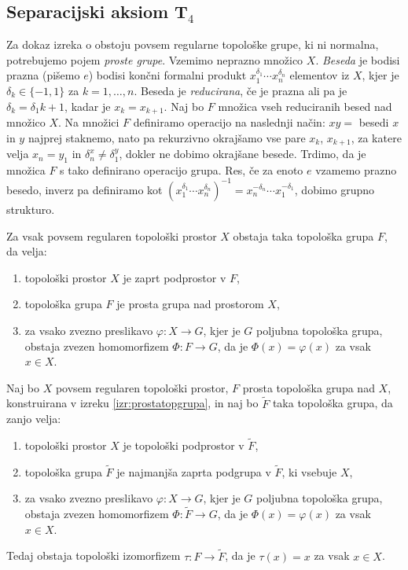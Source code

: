\documentclass[mat1]{fmfdelo}
\begin{document}
\subsection{Separacijski aksiom T$_4$}
Za dokaz izreka o obstoju povsem regularne topološke grupe, ki ni normalna, potrebujemo pojem \emph{proste grupe}. Vzemimo neprazno množico $X$. \emph{Beseda} je bodisi prazna (pišemo $e$) bodisi končni formalni produkt $x_1^{\delta_1}\cdots x_n^{\delta_n}$ elementov iz $X$, kjer je $\delta_k \in \lbrace -1, 1\rbrace$ za $k = 1,\dots,n$. Beseda je \emph{reducirana}, če je prazna ali pa je $\delta_k = \delta_1{k+1}$, kadar je $x_k = x_{k+1}$. Naj bo $F$ množica vseh reduciranih besed nad množico $X$. Na množici $F$ definiramo operacijo na naslednji način: $xy = $ besedi $x$ in $y$ najprej staknemo, nato pa rekurzivno okrajšamo vse pare $x_k$, $x_{k+1}$, za katere velja $x_n = y_1$ in $\delta_n^x \neq \delta_1^y$, dokler ne dobimo okrajšane besede. Trdimo, da je množica $F$ s tako definirano operacijo grupa. Res, če za enoto $e$ vzamemo prazno besedo, inverz pa definiramo kot $(x_1^{\delta_1}\cdots x_n^{\delta_n})^{-1} = x_n^{-\delta_n}\cdots x_1^{-\delta_1}$, dobimo grupno strukturo.

\begin{izrek}\label{izr:prostatopgrupa}
Za vsak povsem regularen topološki prostor $X$ obstaja taka topološka grupa $F$, da velja:
\begin{enumerate}
	\item topološki prostor $X$ je zaprt podprostor v $F$,
	\item topološka grupa $F$ je prosta grupa nad prostorom $X$,
	\item za vsako zvezno preslikavo $\varphi\colon X \to G$, kjer je $G$ poljubna topološka grupa, obstaja zvezen homomorfizem $\Phi\colon F \to G$, da je $\Phi(x) = \varphi(x)$ za vsak $x \in X$.
\end{enumerate}
\end{izrek}

\begin{izrek}\label{izr:prostaizo}
Naj bo $X$ povsem regularen topološki prostor, $F$ prosta topološka grupa nad $X$, konstruirana v izreku \ref{izr:prostatopgrupa}, in naj bo $\widetilde{F}$ taka topološka grupa, da zanjo velja:
\begin{enumerate}
	\item topološki prostor $X$ je topološki podprostor v $\widetilde{F}$,
	\item topološka grupa $\widetilde{F}$ je najmanjša zaprta podgrupa v $\widetilde{F}$, ki vsebuje $X$,
	\item za vsako zvezno preslikavo $\varphi\colon X \to G$, kjer je $G$ poljubna topološka grupa, obstaja zvezen homomorfizem $\Phi\colon \widetilde{F} \to G$, da je $\Phi(x) = \varphi(x)$ za vsak $x \in X$.
\end{enumerate}
Tedaj obstaja topološki izomorfizem $\tau\colon F \to \widetilde{F}$, da je $\tau(x) = x$ za vsak $x \in X$.
\end{izrek}
\end{document}
